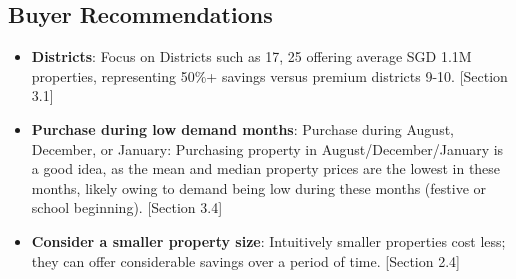 \documentclass{article}
\begin{document}
\subsection{Buyer Recommendations}

\begin{itemize}
    \item \textbf{Districts}: Focus on Districts such as 17, 25 offering average SGD 1.1M properties, representing 50\%+ savings versus premium districts 9-10. [Section 3.1]
    \item \textbf{Purchase during low demand months}: Purchase during August, December, or January: Purchasing property in August/December/January is a good idea, as the mean and median property prices are the lowest in these months, likely owing to demand being low during these months (festive or school beginning). [Section 3.4]
    \item \textbf{Consider a smaller property size}: Intuitively smaller properties cost less; they can offer considerable savings over a period of time. [Section 2.4]
\end{itemize}
\end{document}
